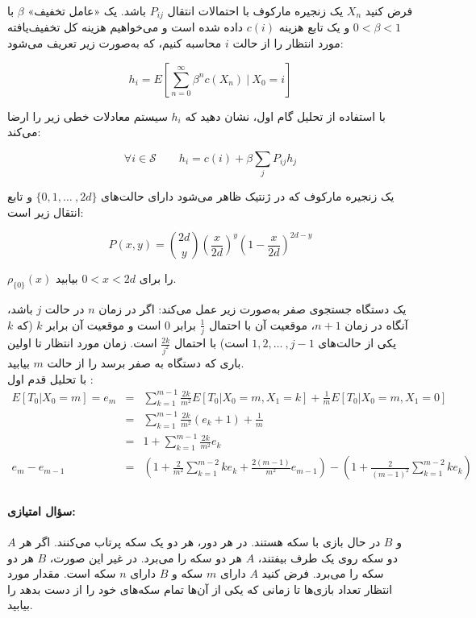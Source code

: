 \documentclass[11pt, a4, twoside]{article}
\begin{document}
	\begin{problem} %
    فرض کنید $X_n$ یک زنجیره مارکوف با احتمالات انتقال $P_{ij}$ باشد. یک «عامل تخفیف» $\beta$ با $0 < \beta < 1$ و یک تابع هزینه $c(i)$ داده شده است و می‌خواهیم هزینه کل تخفیف‌یافته مورد انتظار را از حالت $i$ محاسبه کنیم، که به‌صورت زیر تعریف می‌شود:
    
    \[
    h_i = E\left[\sum_{n=0}^{\infty} \beta^n c(X_n) \ | \ X_0 = i\right]
    \]
    
    با استفاده از تحلیل گام اول، نشان دهید که $h_i$ سیستم معادلات خطی زیر را ارضا می‌کند:
    
    \[
    \forall i \in \mathcal{S} \qquad h_i = c(i) + \beta \sum_j P_{ij} h_j
    \] 

	\end{problem}

	\begin{problem} %
    یک زنجیره مارکوف که در ژنتیک ظاهر می‌شود دارای حالت‌های $\{0, 1, \dots\ , 2d\}$ و تابع انتقال زیر است:
    
    \[
    P(x,y) = \binom{2d}{y}\left(\frac{x}{2d}\right)^y\left(1 - \frac{x}{2d}\right)^{2d-y}
    \]
    
    $\rho_{\{0\}}(x)$ را برای $0 < x < 2d$ بیابید.

	\end{problem}

	\begin{problem} %
    یک دستگاه جستجوی صفر به‌صورت زیر عمل می‌کند: اگر در زمان $n$ در حالت $j$ باشد، آنگاه در زمان $n + 1$، موقعیت آن با احتمال $\frac{1}{j}$ برابر $0$ است و موقعیت آن برابر $k$ (که $k$ یکی از حالت‌های $1, 2, \dots\ , j - 1$ است) با احتمال $\frac{2k}{j^2}$ است. زمان مورد انتظار تا اولین باری که دستگاه به صفر برسد را از حالت $m$ بیابید. \\
	{\color{blue}
	با تحلیل قدم اول :
	\begin{eqnarray*}
		E[T_0 | X_0 = m] = e_m &=& \sum_{k=1}^{m-1} \frac{2k}{m^2} E[T_0 | X_0 = m, X_1 = k] + \frac{1}{m} E[T_0 | X_0 = m, X_1 = 0] \\
		&=& \sum_{k=1}^{m-1} \frac{2k}{m^2} \left(e_{k} + 1 \right) + \frac{1}{m} \\
		&=& 1 + \sum_{k=1}^{m-1} \frac{2k}{m^2} e_k \\
		e_m - e_{m-1} &=& \left(1 + \frac{2}{m^2} \sum_{k=1}^{m-2} k e_k + \frac{2(m-1)}{m^2}e_{m-1}\right) - \left(1  + \frac{2}{(m-1)^2} \sum_{k=1}^{m-2} k e_k\right) \\
	\end{eqnarray*}
	}
	\end{problem}

\paragraph{\textbf{سؤال امتیازی:}} $A$ و $B$ در حال بازی با سکه هستند. در هر دور، هر دو یک سکه پرتاب می‌کنند. اگر هر دو سکه روی یک طرف بیفتند، $A$ هر دو سکه را می‌برد. در غیر این صورت، $B$ هر دو سکه را می‌برد. فرض کنید $A$ دارای $m$ سکه و $B$ دارای $n$ سکه است. مقدار مورد انتظار تعداد بازی‌ها تا زمانی که یکی از آن‌ها تمام سکه‌های خود را از دست بدهد را بیابید.
\end{document}
